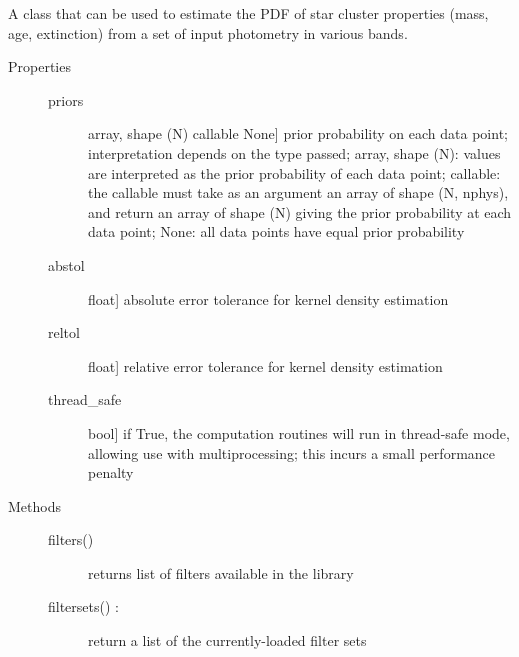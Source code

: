 \documentclass[letterpaper,10pt,english]{sphinxmanual}
\begin{document}
\begin{fulllineitems}
\label{cluster_slug:slugpy.cluster_slug.cluster_slug}
A class that can be used to estimate the PDF of star cluster
properties (mass, age, extinction) from a set of input photometry
in various bands.
\begin{description}
\item[{Properties}] \leavevmode\begin{description}
\item[{priors}] \leavevmode{[}array, shape (N) \textbar{} callable \textbar{} None{]}
prior probability on each data point; interpretation
depends on the type passed; array, shape (N): values are
interpreted as the prior probability of each data point;
callable: the callable must take as an argument an array
of shape (N, nphys), and return an array of shape (N)
giving the prior probability at each data point; None:
all data points have equal prior probability

\item[{abstol}] \leavevmode{[}float{]}
absolute error tolerance for kernel density estimation

\item[{reltol}] \leavevmode{[}float{]}
relative error tolerance for kernel density estimation

\item[{thread\_safe}] \leavevmode{[}bool{]}
if True, the computation routines will run in thread-safe
mode, allowing use with multiprocessing; this incurs a small
performance penalty

\end{description}

\item[{Methods}] \leavevmode\begin{description}
\item[{filters()}] \leavevmode{[}{]}
returns list of filters available in the library

\item[{filtersets() :}] \leavevmode
return a list of the currently-loaded filter sets


\end{description}
\end{description}
\end{fulllineitems}
\end{document}
